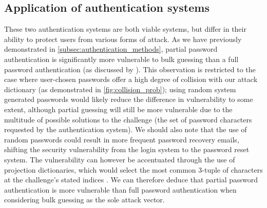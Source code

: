 \documentclass[british,11pt,a4paper]{article}
\begin{document}





\subsection{Application of authentication systems}
These two authentication systems are both viable systems, but differ in their ability to protect users from various forms of attack. As we have previously demonstrated in \autoref{subsec:authentication_methods}, partial password authentication is significantly more vulnerable to bulk guessing than a full password authentication (as discussed by \citet{Aspinall2013-sh}). This observation is restricted to the case where user-chosen passwords offer a high degree of collision with our attack dictionary (as demonstrated in \autoref{fig:collision_prob}); using random system generated passwords would likely reduce the difference in vulnerability to some extent, although partial guessing will still be more vulnerable due to the multitude of possible solutions to the challenge (the set of password characters requested by the authentication system). We should also note that the use of random passwords could result in more frequent password recovery emails, shifting the security vulnerability from the login system to the password reset system. The vulnerability can however be accentuated through the use of projection dictionaries, which would select the most common 3-tuple of characters at the challenge's stated indices \cite{Aspinall2013-sh}. We can therefore deduce that partial password authentication is more vulnerable than full password authentication when considering bulk guessing as the sole attack vector.
\end{document}
